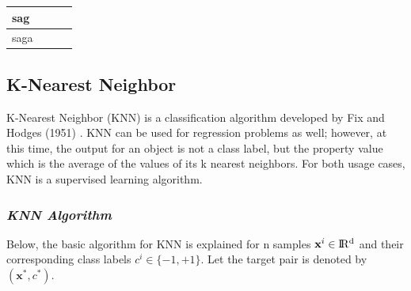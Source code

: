\begin{table}[h]
\begin{tabular}{|l|c|c|c|}
		sag                                         & \checkmark                                                                          &                                                                            & \checkmark                                                                          \\ \hline
		saga                                             & \checkmark                                                                          & \checkmark                                                                          & \checkmark                                                                          \\ \hline
	\end{tabular}
\end{table}


\subsection{K-Nearest Neighbor}

K-Nearest Neighbor (KNN) is a classification algorithm developed by Fix and Hodges (1951) \cite{knn_pdf}. KNN can be used for regression problems as well; however, at this time, the output for an object is not a class label, but the property value which is the average of the values of its k nearest neighbors. For both usage cases, KNN is a supervised learning algorithm.

\subsubsection*{\textit{KNN Algorithm}}

Below, the basic algorithm for KNN is explained for n samples $\textbf{x}^{i} \in \rm I\!R^{d}$ and their corresponding class labels $c^{i} \in \{-1, +1\}$. Let the target pair is denoted by $(\textbf{x}^{*}, c^{*})$.

